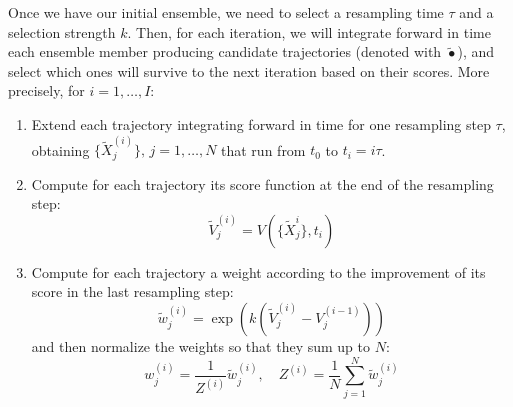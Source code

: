 Once we have our initial ensemble, we need to select a resampling time $\tau$ and a selection strength $k$. Then, for each iteration, we will integrate forward in time each ensemble member producing candidate trajectories (denoted with $\tilde{\bullet}$), and select which ones will survive to the next iteration based on their scores. More precisely, for $i = 1, \ldots, I$:

\begin{enumerate}
    \item Extend each trajectory integrating forward in time for one resampling step $\tau$, obtaining $\{\tilde{X}^{(i)}_j\}, \, j = 1, \ldots, N$ that run from $t_0$ to $t_i = i\tau$.

    \item Compute for each trajectory its score function at the end of the resampling step:
    $$\tilde{V}_j^{(i)} = V(\{\tilde{X}_j^{i}\}, t_i)$$

    \item Compute for each trajectory a weight according to the improvement of its score in the last resampling step:
    $$\tilde{w}_j^{(i)} = \exp\left( k\left( \tilde{V}_j^{(i)} - V_j^{(i-1)} \right) \right) $$
    and then normalize the weights so that they sum up to $N$:
    $$w_j^{(i)} = \frac{1}{Z^{(i)}} \tilde{w}_j^{(i)}, \quad Z^{(i)} = \frac{1}{N}\sum_{j=1}^N \tilde{w}_j^{(i)}$$


\end{enumerate}
